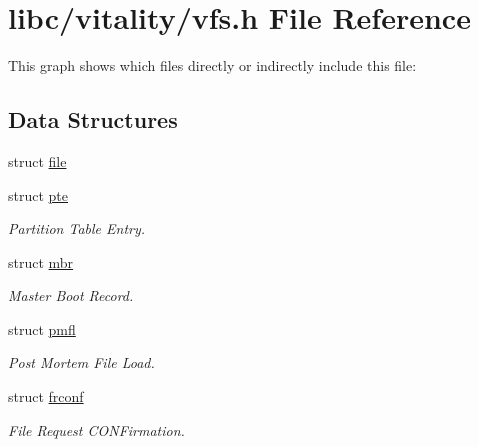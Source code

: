 \hypertarget{a00191}{}\section{libc/vitality/vfs.h File Reference}
\label{a00191}
This graph shows which files directly or indirectly include this file\+:
\subsection*{Data Structures}
\begin{DoxyCompactItemize}
\item 
struct \hyperlink{a00308}{file}
\item 
struct \hyperlink{a00312}{pte}
\begin{DoxyCompactList}\small\item\em Partition Table Entry. \end{DoxyCompactList}\item 
struct \hyperlink{a00316}{mbr}
\begin{DoxyCompactList}\small\item\em Master Boot Record. \end{DoxyCompactList}\item 
struct \hyperlink{a00320}{pmfl}
\begin{DoxyCompactList}\small\item\em Post Mortem File Load. \end{DoxyCompactList}\item 
struct \hyperlink{a00324}{frconf}
\begin{DoxyCompactList}\small\item\em File Request C\+O\+N\+Firmation. \end{DoxyCompactList}\end{DoxyCompactItemize}
